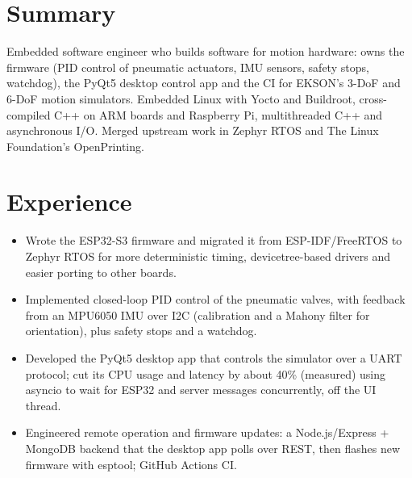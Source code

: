 \documentclass[10pt]{article}
\begin{document}

\section*{Summary}
Embedded software engineer who builds software for motion hardware: owns the firmware (PID control of pneumatic actuators, IMU sensors, safety stops, watchdog), the PyQt5 desktop control app and the CI for EKSON's 3-DoF and 6-DoF motion simulators. Embedded Linux with Yocto and Buildroot, cross-compiled C++ on ARM boards and Raspberry Pi, multithreaded C++ and asynchronous I/O. Merged upstream work in Zephyr RTOS and The Linux Foundation's OpenPrinting.

\section*{Experience}
\begin{itemize}
  \item Wrote the ESP32-S3 firmware and migrated it from ESP-IDF/FreeRTOS to Zephyr RTOS for more deterministic timing, devicetree-based drivers and easier porting to other boards.
  \item Implemented closed-loop PID control of the pneumatic valves, with feedback from an MPU6050 IMU over I2C (calibration and a Mahony filter for orientation), plus safety stops and a watchdog.
  \item Developed the PyQt5 desktop app that controls the simulator over a UART protocol; cut its CPU usage and latency by about 40\% (measured) using asyncio to wait for ESP32 and server messages concurrently, off the UI thread.
  \item Engineered remote operation and firmware updates: a Node.js/Express + MongoDB backend that the desktop app polls over REST, then flashes new firmware with esptool; GitHub Actions CI.
\end{itemize}
\end{document}

